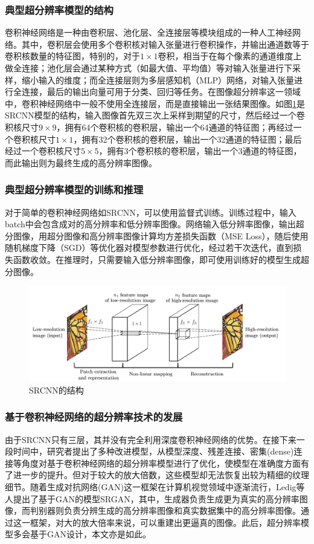 \subsubsection{典型超分辨率模型的结构}
卷积神经网络是一种由卷积层、池化层、全连接层等模块组成的一种人工神经网络。其中，卷积层会使用多个卷积核对输入张量进行卷积操作，并输出通道数等于卷积核数量的特征图，特别的，对于$1\times 1$卷积，相当于在每个像素的通道维度上做全连接；池化层会通过某种方式（如最大值、平均值）等对输入张量进行下采样，缩小输入的维度；而全连接层则为多层感知机（MLP）网络，对输入张量进行全连接，最后的输出向量可用于分类、回归等任务。在图像超分辨率这一领域中，卷积神经网络中一般不使用全连接层，而是直接输出一张结果图像。如图\ref{fig:SRCNN}是SRCNN模型的结构，输入图像首先双三次上采样到期望的尺寸，然后经过一个卷积核尺寸$9\times 9$，拥有64个卷积核的卷积层，输出一个64通道的特征图；再经过一个卷积核尺寸$1\times 1$，拥有32个卷积核的卷积层，输出一个32通道的特征图；最后经过一个卷积核尺寸$5\times 5$，拥有3个卷积核的卷积层，输出一个3通道的特征图，而此输出则为最终生成的高分辨率图像。
\subsubsection{典型超分辨率模型的训练和推理}
对于简单的卷积神经网络如SRCNN，可以使用监督式训练。训练过程中，输入batch中会包含成对的高分辨率和低分辨率图像。网络输入低分辨率图像，输出超分图像，用超分图像和高分辨率图像计算均方差损失函数（MSE Loss），随后使用随机梯度下降（SGD）等优化器对模型参数进行优化，经过若干次迭代，直到损失函数收敛。在推理时，只需要输入低分辨率图像，即可使用训练好的模型生成超分图像。

\begin{figure}[h]
    \centering
    \includegraphics[width=1.0\textwidth]{imgs/SRCNN.png}
    \caption{SRCNN的结构}
    \label{fig:SRCNN}
\end{figure}

\subsubsection{基于卷积神经网络的超分辨率技术的发展}
由于SRCNN只有三层，其并没有完全利用深度卷积神经网络的优势。在接下来一段时间中，研究者提出了多种改进模型，从模型深度、残差连接、密集(dense)连接等角度对基于卷积神经网络的超分辨率模型进行了优化，使模型在准确度方面有了进一步的提升。但对于较大的放大倍数，这些模型却无法恢复出较为精细的纹理细节。随着生成对抗网络\parencite{goodfellow2020generative}(GAN)这一框架在计算机视觉领域中逐渐流行，Ledig等人\parencite{fritsche2019frequency}提出了基于GAN的模型SRGAN，其中，生成器负责生成更为真实的高分辨率图像，而判别器则负责分辨生成的高分辨率图像和真实数据集中的高分辨率图像。通过这一框架，对大的放大倍率来说，可以重建出更逼真的图像。此后，超分辨率模型多会基于GAN设计，本文亦是如此。

